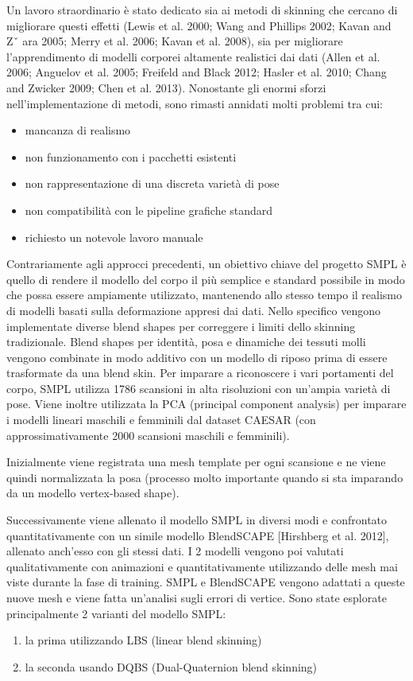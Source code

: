 \newpage

Un lavoro straordinario è stato dedicato sia ai metodi di skinning che cercano di migliorare questi effetti (Lewis et al. 2000; Wang and Phillips 2002; Kavan and Zˇ ara 2005; Merry et al. 2006; Kavan et al. 2008), sia per migliorare l’apprendimento di modelli corporei altamente realistici dai dati (Allen et al. 2006; Anguelov et al. 2005; Freifeld and Black 2012; Hasler et al. 2010; Chang and Zwicker 2009; Chen et al. 2013).
Nonostante gli enormi sforzi nell’implementazione di metodi, sono rimasti annidati molti problemi tra cui:
\begin{itemize}
\item mancanza di realismo
\item non funzionamento con i pacchetti esistenti
\item non rappresentazione di una discreta varietà di pose
\item non compatibilità con le pipeline grafiche standard
\item richiesto un notevole lavoro manuale
\end{itemize}

Contrariamente agli approcci precedenti, un obiettivo chiave del progetto SMPL è quello di rendere il modello del corpo il più semplice e standard possibile in modo che possa essere ampiamente utilizzato, mantenendo allo stesso tempo il  realismo di modelli basati sulla deformazione appresi dai dati. Nello specifico vengono implementate diverse blend shapes per correggere i limiti dello skinning tradizionale.
Blend shapes per identità, posa e dinamiche dei tessuti molli vengono combinate in modo additivo con un modello di riposo prima di essere trasformate da una blend skin.
Per imparare a riconoscere i vari portamenti del corpo, SMPL utilizza 1786 scansioni in alta risoluzioni con un'ampia varietà di pose.
Viene inoltre utilizzata la PCA (principal component analysis) per imparare i modelli lineari maschili e femminili dal dataset CAESAR (con approssimativamente 2000 scansioni maschili e femminili). 

\medskip

Inizialmente viene registrata una mesh template per ogni scansione e ne viene quindi normalizzata la posa (processo molto importante quando si sta imparando da un modello vertex-based shape).


\medskip

Successivamente viene allenato il modello SMPL in diversi modi e confrontato quantitativamente con un simile modello BlendSCAPE [Hirshberg et al. 2012], allenato anch’esso con gli stessi dati.
I 2 modelli vengono poi valutati qualitativamente con animazioni e quantitativamente utilizzando delle mesh mai viste durante la fase di training.
SMPL e BlendSCAPE vengono adattati a queste nuove mesh e viene fatta un’analisi sugli errori di vertice.
Sono state esplorate principalmente 2 varianti del modello SMPL:
\begin{enumerate}
\item la prima utilizzando LBS (linear blend skinning)
\item la seconda usando DQBS (Dual-Quaternion blend skinning)
\end{enumerate}

